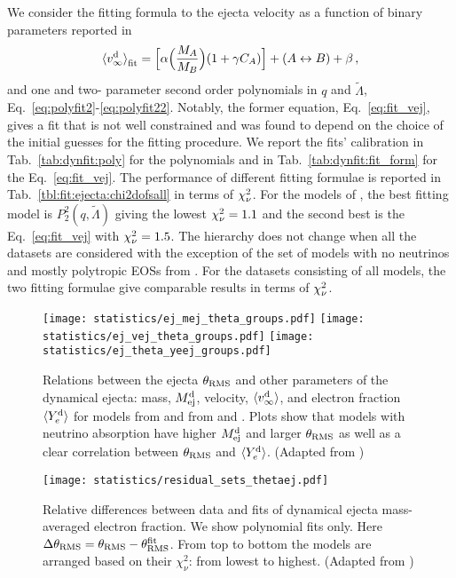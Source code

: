 We consider the fitting formula to the ejecta velocity as a function of binary parameters 
reported in \citet{Dietrich:2016hky,Radice:2018pdn}
%
\begin{equation}
{\langle v^{\text{d}}_\infty\rangle}_{\rm fit} = \Big[\alpha\Big(\frac{M_A}{M_B}\Big)(1+\gamma C_A)\Big] + (A\leftrightarrow B) + \beta
\label{eq:fit_vej} \, ,
\end{equation}
%
and one and two- parameter second order polynomials in $q$ and $\tilde{\Lambda}$, 
Eq.~\eqref{eq:polyfit2}-\eqref{eq:polyfit22}. Notably, the former equation, 
Eq.~\eqref{eq:fit_vej}, gives a fit that is not well constrained and was found to 
depend on the choice of the initial guesses for the fitting procedure.
%
We report the fits' calibration in Tab.~\ref{tab:dynfit:poly} for the polynomials and 
in Tab.~\ref{tab:dynfit:fit_form} for the Eq.~\eqref{eq:fit_vej}.
The performance of different fitting formulae is reported in 
Tab.~\ref{tbl:fit:ejecta:chi2dofsall} in terms of $\chi_{\nu}^2$.
%
For the models of \DSrefset{}, the best fitting model is $P_2^2(q,\tilde\Lambda)$ giving the lowest 
$\chi_{\nu}^2=1.1$ and the second best is the Eq.~\eqref{eq:fit_vej} with $\chi_{\nu}^2=1.5$.
The hierarchy does not change when all the datasets are considered with 
the exception of the set of models with no neutrinos and mostly polytropic 
\acp{EOS} from \citet{Bauswein:2013yna}. For the datasets consisting of all models, 
the two fitting formulae give comparable results in terms of $\chi_{\nu}^2$.

\begin{figure*}[t]
    \centering 
    \texttt{[image: statistics/ej\_mej\_theta\_groups.pdf]}
    \texttt{[image: statistics/ej\_vej\_theta\_groups.pdf]}
    \texttt{[image: statistics/ej\_theta\_yeej\_groups.pdf]}
    \caption{
        Relations between the ejecta $\theta_{\rm RMS}$ and other parameters of the dynamical
        ejecta: mass, $M^{\text{d}}_{\text{ej}}$, velocity, $\langle v^{\text{d}}_\infty\rangle$, and electron fraction $\langle Y^{\text{d}}_{e}\rangle$ for models from
        \DSrefset{} and \cite{Radice:2018pdn} from \DScool{} and \DSheatcool{}.
        Plots show that models with neutrino absorption have
        higher $M^{\text{d}}_{\text{ej}}$ and larger $\theta_{\rm RMS}$ as well as 
        a clear correlation between $\theta_{\rm RMS}$ and $\langle Y^{\text{d}}_{e}\rangle$.
        (Adapted from \citet{Nedora:2020qtd})
    }
    \label{fig:ejecta:dynej_thetarms}
\end{figure*}

\begin{figure}[t]
    \centering 
    \texttt{[image: statistics/residual\_sets\_thetaej.pdf]}
    \caption{
        Relative differences between data and fits of dynamical
        ejecta mass-averaged electron fraction.
        We show polynomial fits only.
        Here $\Delta \theta_{\rm RMS} = \theta_{\rm RMS} - \theta^{\rm fit}_{\rm RMS}$.
        From top to bottom the models are arranged based on their $\chi_{\nu}^2$: from lowest to highest.
        (Adapted from \citet{Nedora:2020qtd})
    }
    \label{fig:ejecta:dyn:theta}
\end{figure}

